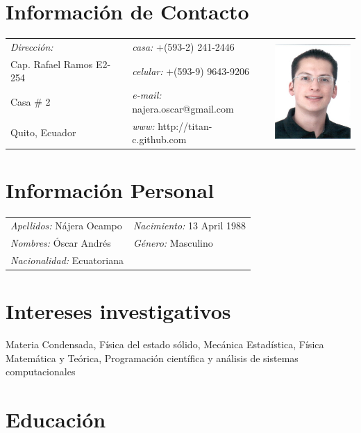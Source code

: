 \documentclass[margin,line]{res}
\newenvironment{list1}{
  \begin{list}{\ding{113}}{%
      \setlength{\itemsep}{0in}
      \setlength{\parsep}{0in} \setlength{\parskip}{0in}
      \setlength{\topsep}{0in} \setlength{\partopsep}{0in} 
      \setlength{\leftmargin}{0.17in}}}{\end{list}}
\begin{document}

\begin{resume}

\section{\sc Información de Contacto}
  \begin{tabular}{@{}p{2in}p{2.5in}p{3cm} }
    {\it Dirección:}		& {\it casa:}  +(593-2) 241-2446 &
      \multirow{4}{*}{ \includegraphics[width=3cm,bb=0 0 101 126]{./foto2012.jpg}}\\

    Cap. Rafael Ramos E2-254	& {\it celular:} +(593-9) 9643-9206 \\
    Casa \# 2			& {\it e-mail:}  najera.oscar@gmail.com\\
    Quito, Ecuador		& {\it www:} http://titan-c.github.com
  \end{tabular}\vspace{0.5cm}

\section{\sc Información Personal}
 \begin{tabular}{ll}
  {\it Apellidos:} Nájera Ocampo & {\it Nacimiento:} 13 April 1988\\
  {\it Nombres:} Óscar Andrés   & {\it Género:} Masculino\\
  {\it Nacionalidad:} Ecuatoriana    & %
 \end{tabular}

\section{\sc Intereses investigativos}
  Materia Condensada, Física del estado sólido, Mecánica Estadística, Física Matemática y
  Teórica, Programación científica y análisis de sistemas computacionales

\section{\sc Educación}


\end{resume}
\end{document}
